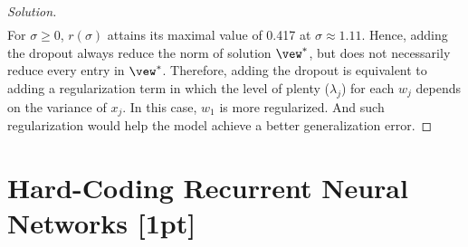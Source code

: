 \documentclass{article}
\begin{document}
\begin{proof}[Solution]
\begin{align}
		\end{align}
		For $\sigma \geq 0$, $r(\sigma)$ attains its maximal value of 0.417 at $\sigma \approx 1.11$. Hence, adding the dropout always reduce the norm of solution $\vew^*$, but does not necessarily reduce every entry in $\vew^*$.
		Therefore, adding the dropout is equivalent to adding a regularization term in which the level of plenty ($\lambda_j$) for each $w_j$ depends on the variance of $x_j$. In this case, $w_1$ is more regularized. And such regularization would help the model achieve a better generalization error.
	\end{proof}
	
	\section{Hard-Coding Recurrent Neural Networks [1pt]}
\end{document}
